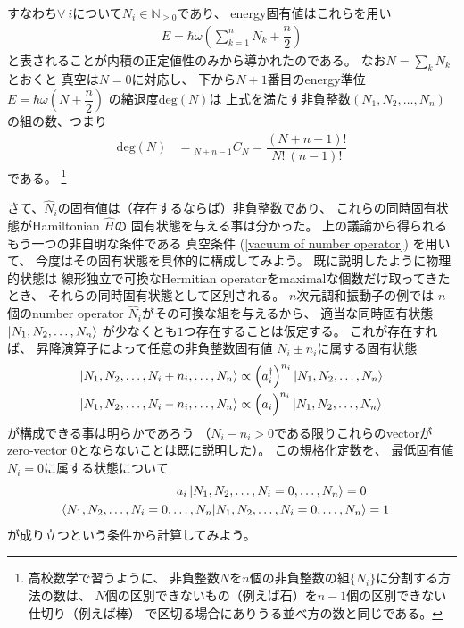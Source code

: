すなわち$\forall\ i$について$N_i \in \mathbb{N}_{\ge 0}$であり、
energy固有値はこれらを用い
\begin{align}
    E = \hbar\omega
    \left(
    \sum_{k=1}^n
        N_k
    +
        \dfrac{ n }{ 2 }
    \right)
\end{align}
と表されることが内積の正定値性のみから導かれたのである。
なお$N = \sum_k N_k$とおくと
真空は$N=0$に対応し、
下から$N+1$番目のenergy準位
$E = \hbar \omega \left(N + \dfrac{n}{2} \right) $
の縮退度$\mathrm{deg}(N)$は
上式を満たす非負整数$(N_1, N_2,\dots, N_n)$の組の数、つまり
\begin{align}
    \mathrm{deg}(N)
    &=
    {}_{N + n-1}C_{N}
    =
    \dfrac{(N+n-1)!}{N!\ (n-1)!}
\end{align}
である。
\footnote{
    高校数学で習うように、
    非負整数$N$を$n$個の非負整数の組$\{N_i\}$に分割する方法の数は、
    $N$個の区別できないもの（例えば石）を$n-1$個の区別できない仕切り（例えば棒）
    で区切る場合にありうる並べ方の数と同じである。
}

さて、$\hat{N}_i$の固有値は（存在するならば）非負整数であり、
これらの同時固有状態がHamiltonian $\hat{H}$の
固有状態を与える事は分かった。
上の議論から得られるもう一つの非自明な条件である
真空条件
(\ref{vacuum of number operator})
を用いて、
今度はその固有状態を具体的に構成してみよう。
既に説明したように物理的状態は
線形独立で可換なHermitian operatorをmaximalな個数だけ取ってきたとき、
それらの同時固有状態として区別される。
$n$次元調和振動子の例では
$n$個のnumber operator $\hat{N}_i$がその可換な組を与えるから、
適当な同時固有状態
$\ket{N_1, N_2,\dots, N_n}$
が少なくとも$1$つ存在することは仮定する。
これが存在すれば、
昇降演算子によって任意の非負整数固有値
$N_i\pm n_i$に属する固有状態
\begin{subequations}
\begin{align}
    \ket{N_1, N_2,\dots,N_i+n_i,\dots, N_n}
    &\propto
    \left(
        a_i^\dagger
    \right)^{n_i}
    \ket{N_1, N_2,\dots, N_n}
\\
    \ket{N_1, N_2,\dots,N_i-n_i,\dots, N_n}
    &\propto
    \Big(
        a_i
    \Big)^{n_i}
    \ket{N_1, N_2,\dots, N_n}
\end{align}
\end{subequations}
が構成できる事は明らかであろう
（$N_i - n_i > 0$である限りこれらのvectorが
zero-vector $0$とならないことは既に説明した）。
この規格化定数を、
最低固有値$N_i = 0$に属する状態について
\begin{align}
    a_i \ket{N_1, N_2,\dots, N_i = 0,\dots, N_n} = 0
\\
    \braket{N_1, N_2,\dots, N_i = 0,\dots, N_n
    |
    N_1, N_2,\dots, N_i = 0,\dots, N_n}
    &=1
\end{align}
が成り立つという条件から計算してみよう。


